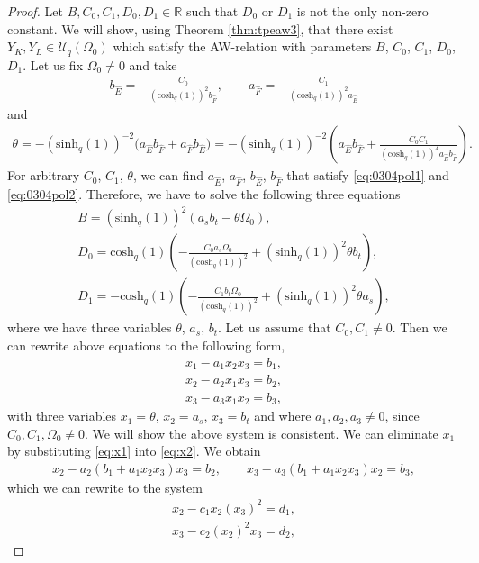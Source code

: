 \documentclass[10pt,a4paper]{amsart}
\numberwithin{equation}{section}
\newcommand{\RR}{\mathbb{R}}
\newcommand{\chq}{\mathrm{cosh}_q}
\newcommand{\shq}{\mathrm{sinh}_q}
\newcommand{\UqO}[1][q]{\mathcal{U}_{#1}\left(\Omega_0\right)}
\begin{document}
\begin{proof}
	Let $B,C_0,C_1,D_0,D_1\in\RR$ such that $D_0$ or $D_1$ is not the only non-zero constant. We will show, using Theorem \ref{thm:tpeaw3}, that there exist $Y_K,Y_L\in\UqO$ which satisfy the AW-relation with parameters $B$, $C_0$, $C_1$, $D_0$, $D_1$. Let us fix $\Omega_0\neq0$ and take
\begin{gather}
b_{\hat{E}}=-\frac{C_0}{(\chq(1))^2b_{\hat{F}}},\qquad a_{\hat{F}}=-\frac{C_1}{(\chq(1))^2a_{\hat{E}}}\label{eq:0304pol1}
\end{gather}
	and
	\begin{gather}\label{eq:0304pol2}
		\theta=-(\shq(1))^{-2}\big(a_{\hat{E}}b_{\hat{F}}+a_{\hat{F}}b_{\hat{E}}\big)=-(\shq(1))^{-2}\left( a_{\hat{E}}b_{\hat{F}}+ \frac{C_0C_1}{(\chq(1))^4a_{\hat{E}}b_{\hat{F}}}\right).
	\end{gather}
	For arbitrary $C_0$, $C_1$, $\theta$, we can find $a_{\hat{E}}$, $a_{\hat{F}}$, $b_{\hat{E}}$, $b_{\hat{F}}$ that satisfy \eqref{eq:0304pol1} and \eqref{eq:0304pol2}. Therefore, we have to solve the following three equations
	\begin{gather*}
B=(\shq(1))^2(a_s b_t-\theta\Omega_0),\\
D_0=\chq(1)\left(-\frac{C_0a_s\Omega_0}{(\chq(1))^2} +(\shq(1))^2\theta b_t\right),\\
D_1=-\chq(1)\left(-\frac{C_1b_t\Omega_0}{(\chq(1))^2} +(\shq(1))^2\theta a_s\right),
\end{gather*}
	where we have three variables $\theta$, $a_s$, $b_t$. Let us assume that $C_0,C_1\neq0$. Then we can rewrite above equations to the following form,
	\begin{gather}
x_1-a_1x_2x_3=b_1,\label{eq:x1}\\
x_2-a_2x_1x_3=b_2,\label{eq:x2}\\
x_3-a_3x_1x_2=b_3,\label{eq:x3}
	\end{gather}
	with three variables $x_1=\theta$, $x_2=a_s$, $x_3=b_t$ and where $a_1,a_2,a_3\neq0$, since $C_0,C_1,\Omega_0\neq0$. We will show the above system is consistent. We can eliminate $x_1$ by substituting \eqref{eq:x1} into \eqref{eq:x2}. We obtain
	\begin{gather*}
x_2-a_2(b_1+a_1x_2x_3)x_3=b_2,\qquad
x_3-a_3(b_1+a_1x_2x_3)x_2=b_3,
	\end{gather*}
which we can rewrite to the system
	\begin{gather}
x_2-c_1x_2(x_3)^2=d_1,\label{eq:system21}\\
x_3-c_2(x_2)^2x_3=d_2,\label{eq:system22}
	\end{gather}

\end{proof}
\end{document}
